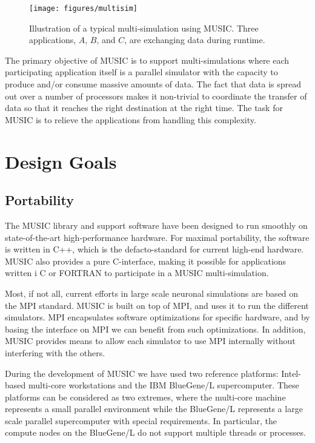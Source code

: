 \documentclass[a4paper]{report}
\begin{document}
\begin{figure}
  \begin{center}
    \texttt{[image: figures/multisim]}
    \caption[Typical multi-simulation]{\label{fig:multisim}
      Illustration of a typical multi-simulation using MUSIC.  Three
      applications, $A$, $B$, and $C$, are exchanging data during
      runtime.
    }
  \end{center}
\end{figure}

The primary objective of MUSIC is to support multi-simulations where
each participating application itself is a parallel simulator with the
capacity to produce and/or consume massive amounts of data.  The fact
that data is spread out over a number of processors makes it
non-trivial to coordinate the transfer of data so that it reaches the
right destination at the right time.  The task for MUSIC is to relieve
the applications from handling this complexity.


\section{Design Goals}

\subsection{Portability}

The MUSIC library and support software have been designed to run
smoothly on state-of-the-art high-performance hardware.  For maximal
portability, the software is written in C++, which is the
defacto-standard for current high-end hardware.  MUSIC also provides a
pure C-interface, making it possible for applications written i C or
FORTRAN to participate in a MUSIC multi-simulation.

Most, if not all, current efforts in large scale neuronal simulations
are based on the MPI standard.  MUSIC is built on top of
MPI, and uses it to run the different simulators.  MPI encapsulates
software optimizations for specific hardware, and by basing the
interface on MPI we can benefit from such optimizations.  In
addition, MUSIC provides means to allow each simulator to use MPI
internally without interfering with the others.

During the development of MUSIC we have used two reference platforms:
Intel-based multi-core workstations and the IBM
BlueGene/L supercomputer.  These
platforms can be considered as two extremes, where the multi-core
machine represents a small parallel environment while the BlueGene/L
represents a large scale parallel supercomputer with special
requirements.  In particular, the compute nodes on the BlueGene/L do
not support multiple threads or processes.
\end{document}
